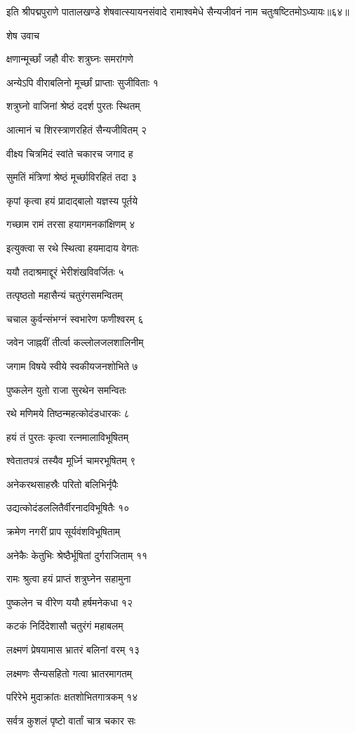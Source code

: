 इति श्रीपद्मपुराणे पातालखण्डे शेषवात्स्यायनसंवादे रामाश्वमेधे सैन्यजीवनं नाम चतुःषष्टितमोऽध्यायः॥६४॥


शेष उवाच

क्षणान्मूर्च्छां जहौ वीरः शत्रुघ्नः समरांगणे

अन्येऽपि वीराबलिनो मूर्च्छां प्राप्ताः सुजीविताः १

शत्रुघ्नो वाजिनां श्रेष्ठं ददर्श पुरतः स्थितम्

आत्मानं च शिरस्त्राणरहितं सैन्यजीवितम् २

वीक्ष्य चित्रमिदं स्वांते चकारच जगाद ह

सुमतिं मंत्रिणां श्रेष्ठं मूर्च्छाविरहितं तदा ३

कृपां कृत्वा हयं प्रादाद्बालो यज्ञस्य पूर्तये

गच्छाम रामं तरसा हयागमनकांक्षिणम् ४

इत्युक्त्वा स रथे स्थित्वा हयमादाय वेगतः

ययौ तदाश्रमाद्दूरं भेरीशंखविवर्जितः ५

तत्पृष्ठतो महासैन्यं चतुरंगसमन्वितम्

चचाल कुर्वन्संभग्नं स्वभारेण फणीश्वरम् ६

जवेन जाह्नवीं तीर्त्वा कल्लोलजलशालिनीम्

जगाम विषये स्वीये स्वकीयजनशोभिते ७

पुष्कलेन युतो राजा सुरथेन समन्वितः

रथे मणिमये तिष्ठन्महत्कोदंडधारकः ८

हयं तं पुरतः कृत्वा रत्नमालाविभूषितम्

श्वेतातपत्रं तस्यैव मूर्ध्नि चामरभूषितम् ९

अनेकरथसाहस्रैः परितो बलिभिर्नृपैः

उद्यत्कोदंडललितैर्वीरनादविभूषितैः १०

क्रमेण नगरीं प्राप सूर्यवंशविभूषिताम्

अनेकैः केतुभिः श्रेष्ठैर्भूषितां दुर्गराजिताम् ११

रामः श्रुत्वा हयं प्राप्तं शत्रुघ्नेन सहामुना

पुष्कलेन च वीरेण ययौ हर्षमनेकधा १२

कटकं निर्दिदेशासौ चतुरंगं महाबलम्

लक्ष्मणं प्रेषयामास भ्रातरं बलिनां वरम् १३

लक्ष्मणः सैन्यसहितो गत्वा भ्रातरमागतम्

परिरेभे मुदाक्रांतः क्षतशोभितगात्रकम् १४

सर्वत्र कुशलं पृष्टो वार्तां चात्र चकार सः

